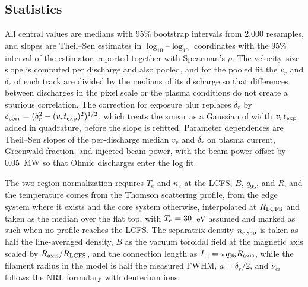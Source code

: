 \subsection{Statistics}
All central values are medians with 95\% bootstrap intervals from 2{,}000 resamples, and slopes are Theil--Sen estimates in $\log_{10}$--$\log_{10}$ coordinates with the 95\% interval of the estimator, reported together with Spearman's $\rho$. The velocity--size slope is computed per discharge and also pooled, and for the pooled fit the $v_r$ and $\delta_r$ of each track are divided by the medians of its discharge so that differences between discharges in the pixel scale or the plasma conditions do not create a spurious correlation. The correction for exposure blur replaces $\delta_r$ by $\delta_{\rm corr} = (\delta_r^2 - (v_r t_{\rm exp})^2)^{1/2}$, which treats the smear as a Gaussian of width $v_r t_{\rm exp}$ added in quadrature, before the slope is refitted. Parameter dependences are Theil--Sen slopes of the per-discharge median $v_r$ and $\delta_r$ on plasma current, Greenwald fraction, and injected beam power, with the beam power offset by 0.05~MW so that Ohmic discharges enter the log fit.

The two-region normalization requires $T_e$ and $n_e$ at the LCFS, $B$, $q_{95}$, and $R$, and the temperature comes from the Thomson scattering profile, from the edge system where it exists and the core system otherwise, interpolated at $R_{\rm LCFS}$ and taken as the median over the flat top, with $T_e = 30$~eV assumed and marked as such when no profile reaches the LCFS. The separatrix density $n_{e,\rm sep}$ is taken as half the line-averaged density, $B$ as the vacuum toroidal field at the magnetic axis scaled by $R_{\rm axis}/R_{\rm LCFS}$, and the connection length as $L_\parallel = \pi q_{95} R_{\rm axis}$, while the filament radius in the model is half the measured FWHM, $a = \delta_r/2$, and $\nu_{ei}$ follows the NRL formulary \citep{nrl2019formulary} with deuterium ions.

